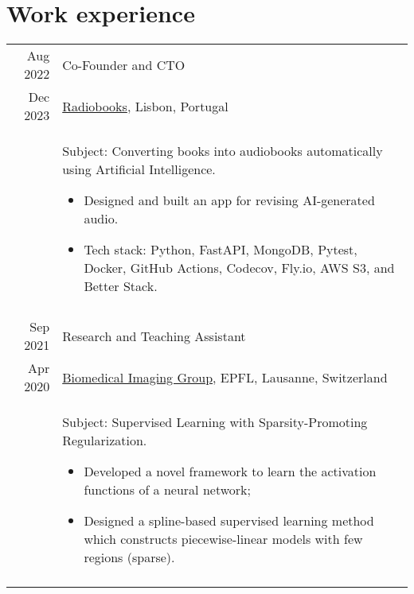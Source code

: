 \documentclass[a4paper,11pt]{article}
\def\datespace{-2pt}
\def\title-main-sep{4pt}
\def\tabwidth{13cm}
\begin{document}

  \newpage

  \section{Work experience}

    \begin{tabular}{r|p{\tabwidth}}

      {\small Aug 2022} & Co-Founder and CTO \\[\datespace]
      {\small Dec 2023} & {\small \href{https://radiobooks.webflow.io/}{Radiobooks}, Lisbon, Portugal} \\[\title-main-sep]
      & {
      \parbox[t]{\tabwidth}{
      \footnotesize Subject: Converting books into audiobooks automatically using Artificial Intelligence.
      \begin{itemize}[topsep=0pt, partopsep=0pt, parsep=0pt, itemsep=0pt, leftmargin=*, after=\vspace{0pt}]
        \item Designed and built an app for revising AI-generated audio.
        \item Tech stack: Python, FastAPI, MongoDB, Pytest, Docker, GitHub Actions, Codecov, Fly.io, AWS S3, and Better Stack.
      \end{itemize}
      }
      } \\
      \multicolumn{2}{c}{} \\


      {\small Sep 2021} 	& Research and Teaching Assistant \\[\datespace]
      {\small Apr 2020} 	& {\small \href{https://bigwww.epfl.ch/}{Biomedical Imaging Group}, EPFL, Lausanne, Switzerland} \\[\title-main-sep]
      & {
        \parbox[t]{\tabwidth}{
        \footnotesize Subject: Supervised Learning with Sparsity-Promoting Regularization.
        \begin{itemize}[topsep=0pt, partopsep=0pt, parsep=0pt, itemsep=0pt, leftmargin=*, after=\vspace{0pt}]
          \item Developed a novel framework to learn the activation functions of a neural network;
          \item Designed a spline-based supervised learning method which constructs piecewise-linear models with few regions (sparse).
        \end{itemize}
        }
      } \\
      \multicolumn{2}{c}{} \\


\end{tabular}
\end{document}
